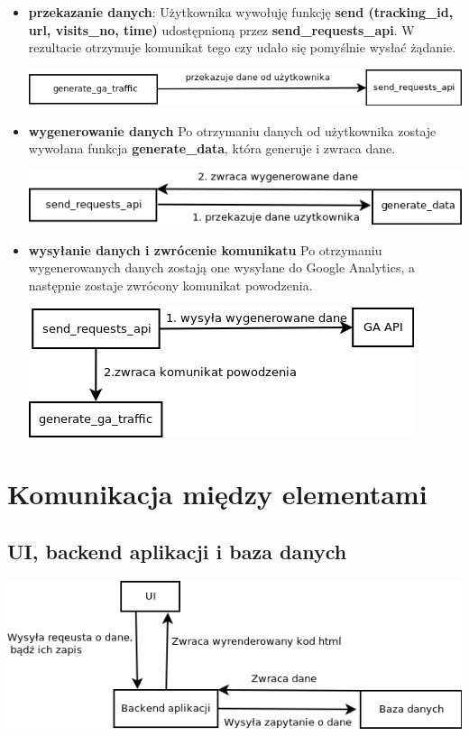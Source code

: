 \documentclass{article}
\begin{document}
\begin{itemize}
\item \textbf{przekazanie danych}:
Użytkownika wywołuję funkcję \textbf{send (tracking\_id, url, visits\_no, time)} udostępnioną przez \textbf{send\_requests\_api}. W rezultacie otrzymuje komunikat tego czy udało się pomyślnie wysłać żądanie.

\begin{center}\includegraphics[scale=0.5]{put_data}\end{center}

\item \textbf{wygenerowanie danych}
Po otrzymaniu danych od użytkownika zostaje wywołana funkcja \textbf{generate\_data}, która generuje i zwraca dane. 

\begin{center}\includegraphics[scale=0.5]{generate_data}\end{center}

\item \textbf{wysyłanie danych i zwrócenie komunikatu}
Po otrzymaniu wygenerowanych danych zostają one wysyłane do Google Analytics, a następnie zostaje zwrócony komunikat powodzenia.

\begin{center}\includegraphics[scale=0.5]{send_data}\end{center}
\end{itemize}

\section{Komunikacja między elementami}
\subsection{UI, backend aplikacji i baza danych}
\begin{center}\includegraphics[scale=0.5]{ui_b}\end{center}
\end{document}
